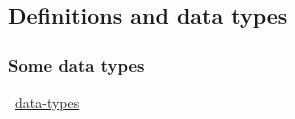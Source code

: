 \subsection{Definitions and data types}

%
%


\begin{frame}[c]
\frametitle{Some data types}

\faLink~\href{../notebooks/Intro/data-types.ipynb}{data-types}

\end{frame}

